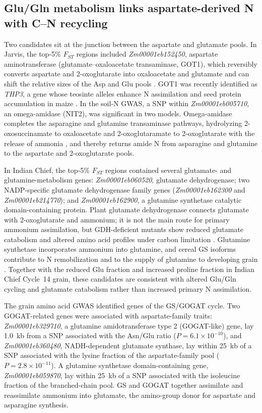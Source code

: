 \subsection{Glu/Gln metabolism links aspartate-derived N with C--N recycling}

Two candidates sit at the junction between the aspartate and glutamate pools. In Jarvis, the top-5\% $F_{ST}$ regions included \textit{Zm00001eb152450}, aspartate aminotransferase (glutamate--oxaloacetate transaminase, GOT1), which reversibly converts aspartate and 2-oxoglutarate into oxaloacetate and glutamate and can shift the relative sizes of the Asp and Glu pools \citep{Han2021Aspartate,Zhou2009AspAT}. GOT1 was recently identified as \textit{THP3}, a gene whose teosinte alleles enhance N assimilation and seed protein accumulation in maize \citep{Huang2026THP3}. In the soil-N GWAS, a SNP within \textit{Zm00001eb005710}, an omega-amidase (NIT2), was significant in two models. Omega-amidase completes the asparagine and glutamine transaminase pathways, hydrolyzing 2-oxosuccinamate to oxaloacetate and 2-oxoglutaramate to 2-oxoglutarate with the release of ammonia \citep{Zhang2014OmegaAmidase}, and thereby returns amide N from asparagine and glutamine to the aspartate and 2-oxoglutarate pools.

In Indian Chief, the top-5\% $F_{ST}$ regions contained several glutamate- and glutamine-metabolism genes: \textit{Zm00001eb060520}, glutamate dehydrogenase; two NADP-specific glutamate dehydrogenase family genes (\textit{Zm00001eb162300} and \textit{Zm00001eb214770}); and \textit{Zm00001eb162900}, a glutamine synthetase catalytic domain-containing protein. Plant glutamate dehydrogenase connects glutamate with 2-oxoglutarate and ammonium; it is not the main route for primary ammonium assimilation, but GDH-deficient mutants show reduced glutamate catabolism and altered amino acid profiles under carbon limitation \citep{Miyashita2008GDH,Dellero2020AminoNUE}. Glutamine synthetase incorporates ammonium into glutamine, and cereal GS isoforms contribute to N remobilization and to the supply of glutamine to developing grain \citep{Wei2021WheatGS,Fujita2022RiceGS13}. Together with the reduced Glu fraction and increased proline fraction in Indian Chief Cycle~14 grain, these candidates are consistent with altered Glu/Gln cycling and glutamate catabolism rather than increased primary N assimilation.

The grain amino acid GWAS identified genes of the GS/GOGAT cycle. Two GOGAT-related genes were associated with aspartate-family traits: \textit{Zm00001eb329710}, a glutamine amidotransferase type 2 (GOGAT-like) gene, lay 1.0~kb from a SNP associated with the Asn/Glu ratio ($P = 6.1 \times 10^{-10}$), and \textit{Zm00001eb360480}, NADH-dependent glutamate synthase, lay within 25~kb of a SNP associated with the lysine fraction of the aspartate-family pool ($P = 2.8 \times 10^{-11}$). A glutamine synthetase domain-containing gene, \textit{Zm00001eb059870}, lay within 25~kb of a SNP associated with the isoleucine fraction of the branched-chain pool. GS and GOGAT together assimilate and reassimilate ammonium into glutamate, the amino-group donor for aspartate and asparagine synthesis.

